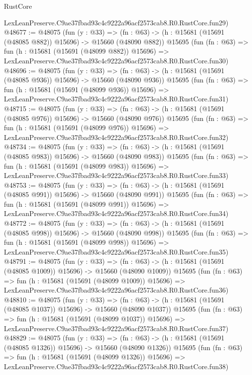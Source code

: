 \begin{lexlean}{RustCore}
\begin{coremodule}
    LexLeanPreserve.C9ae37fbad93c4c9222a96acf2573cab8.R0.RustCore.fun29)
@48677 := @48075
    (fun (y : @33) =>
    (fn : @63) -> (h : @15681 (@15691 (@48085 @882)) @15696) -> @15660 (@48090 @882))
    @15695
    (fun (fn : @63) =>
    fun (h : @15681 (@15691 (@48099 @882)) @15696) =>
    LexLeanPreserve.C9ae37fbad93c4c9222a96acf2573cab8.R0.RustCore.fun30)
@48696 := @48075
    (fun (y : @33) =>
    (fn : @63) -> (h : @15681 (@15691 (@48085 @936)) @15696) -> @15660 (@48090 @936))
    @15695
    (fun (fn : @63) =>
    fun (h : @15681 (@15691 (@48099 @936)) @15696) =>
    LexLeanPreserve.C9ae37fbad93c4c9222a96acf2573cab8.R0.RustCore.fun31)
@48715 := @48075
    (fun (y : @33) =>
    (fn : @63) -> (h : @15681 (@15691 (@48085 @976)) @15696) -> @15660 (@48090 @976))
    @15695
    (fun (fn : @63) =>
    fun (h : @15681 (@15691 (@48099 @976)) @15696) =>
    LexLeanPreserve.C9ae37fbad93c4c9222a96acf2573cab8.R0.RustCore.fun32)
@48734 := @48075
    (fun (y : @33) =>
    (fn : @63) -> (h : @15681 (@15691 (@48085 @983)) @15696) -> @15660 (@48090 @983))
    @15695
    (fun (fn : @63) =>
    fun (h : @15681 (@15691 (@48099 @983)) @15696) =>
    LexLeanPreserve.C9ae37fbad93c4c9222a96acf2573cab8.R0.RustCore.fun33)
@48753 := @48075
    (fun (y : @33) =>
    (fn : @63) -> (h : @15681 (@15691 (@48085 @991)) @15696) -> @15660 (@48090 @991))
    @15695
    (fun (fn : @63) =>
    fun (h : @15681 (@15691 (@48099 @991)) @15696) =>
    LexLeanPreserve.C9ae37fbad93c4c9222a96acf2573cab8.R0.RustCore.fun34)
@48772 := @48075
    (fun (y : @33) =>
    (fn : @63) -> (h : @15681 (@15691 (@48085 @998)) @15696) -> @15660 (@48090 @998))
    @15695
    (fun (fn : @63) =>
    fun (h : @15681 (@15691 (@48099 @998)) @15696) =>
    LexLeanPreserve.C9ae37fbad93c4c9222a96acf2573cab8.R0.RustCore.fun35)
@48791 := @48075
    (fun (y : @33) =>
    (fn : @63) -> (h : @15681 (@15691 (@48085 @1009)) @15696) -> @15660 (@48090 @1009))
    @15695
    (fun (fn : @63) =>
    fun (h : @15681 (@15691 (@48099 @1009)) @15696) =>
    LexLeanPreserve.C9ae37fbad93c4c9222a96acf2573cab8.R0.RustCore.fun36)
@48810 := @48075
    (fun (y : @33) =>
    (fn : @63) -> (h : @15681 (@15691 (@48085 @1037)) @15696) -> @15660 (@48090 @1037))
    @15695
    (fun (fn : @63) =>
    fun (h : @15681 (@15691 (@48099 @1037)) @15696) =>
    LexLeanPreserve.C9ae37fbad93c4c9222a96acf2573cab8.R0.RustCore.fun37)
@48829 := @48075
    (fun (y : @33) =>
    (fn : @63) -> (h : @15681 (@15691 (@48085 @1326)) @15696) -> @15660 (@48090 @1326))
    @15695
    (fun (fn : @63) =>
    fun (h : @15681 (@15691 (@48099 @1326)) @15696) =>
    LexLeanPreserve.C9ae37fbad93c4c9222a96acf2573cab8.R0.RustCore.fun38)

\end{coremodule}
\end{lexlean}
